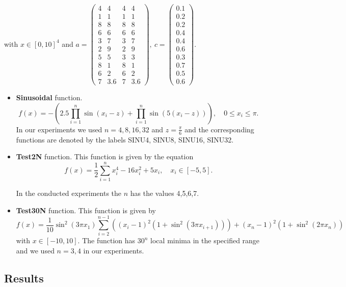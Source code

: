 \documentclass[symmetry,article,submit,moreauthors,pdftex]{mdpi}
\begin{document}
with $x\in[0,10]^{4}$ and $a=\left(\begin{array}{cccc}
4 & 4 & 4 & 4\\
1 & 1 & 1 & 1\\
8 & 8 & 8 & 8\\
6 & 6 & 6 & 6\\
3 & 7 & 3 & 7\\
2 & 9 & 2 & 9\\
5 & 5 & 3 & 3\\
8 & 1 & 8 & 1\\
6 & 2 & 6 & 2\\
7 & 3.6 & 7 & 3.6
\end{array}\right),\ c=\left(\begin{array}{c}
0.1\\
0.2\\
0.2\\
0.4\\
0.4\\
0.6\\
0.3\\
0.7\\
0.5\\
0.6
\end{array}\right)$. 
\begin{itemize}
\item \textbf{Sinusoidal} function. 
\[
f(x)=-\left(2.5\prod_{i=1}^{n}\sin\left(x_{i}-z\right)+\prod_{i=1}^{n}\sin\left(5\left(x_{i}-z\right)\right)\right),\quad0\le x_{i}\le\pi.
\] In our experiments we used $n=4,8,16,32$
and $z=\frac{\pi}{6}$ and the corresponding functions are denoted
by the labels SINU4, SINU8, SINU16, SINU32.
\item \textbf{Test2N} function. This function is given by the equation 
\[
f(x)=\frac{1}{2}\sum_{i=1}^{n}x_{i}^{4}-16x_{i}^{2}+5x_{i},\quad x_{i}\in[-5,5].
\]

In the conducted experiments the $n$ has the values 4,5,6,7.

\item \textbf{Test30N} function. This function is given by 
\[
f(x)=\frac{1}{10}\sin^{2}\left(3\pi x_{1}\right)\sum_{i=2}^{n-1}\left(\left(x_{i}-1\right)^{2}\left(1+\sin^{2}\left(3\pi x_{i+1}\right)\right)\right)+\left(x_{n}-1\right)^{2}\left(1+\sin^{2}\left(2\pi x_{n}\right)\right)
\]
with $x\in[-10,10]$. The function has $30^{n}$ local minima in the
specified range and we used $n=3,4$ in our experiments. 
\end{itemize}

\subsection{Results}
\end{document}
